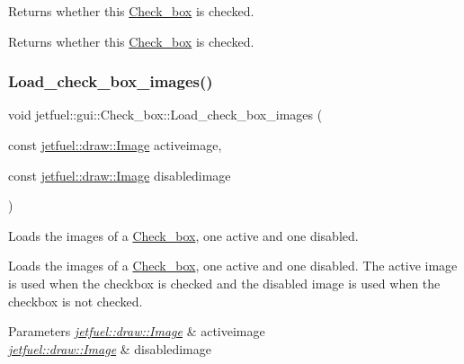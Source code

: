 Returns whether this \hyperlink{classjetfuel_1_1gui_1_1Check__box}{Check\+\_\+box} is checked. 

Returns whether this \hyperlink{classjetfuel_1_1gui_1_1Check__box}{Check\+\_\+box} is checked. \mbox{\label{classjetfuel_1_1gui_1_1Check__box_adadc280e5d14f08e64f974ba9156cd16}} 
\subsubsection{\texorpdfstring{Load\+\_\+check\+\_\+box\+\_\+images()}{Load\_check\_box\_images()}}
{\footnotesize\ttfamily void jetfuel\+::gui\+::\+Check\+\_\+box\+::\+Load\+\_\+check\+\_\+box\+\_\+images (\begin{DoxyParamCaption}\item[{const \hyperlink{classjetfuel_1_1draw_1_1Image}{jetfuel\+::draw\+::\+Image}}]{activeimage,  }\item[{const \hyperlink{classjetfuel_1_1draw_1_1Image}{jetfuel\+::draw\+::\+Image}}]{disabledimage }\end{DoxyParamCaption})\hspace{0.3cm}{\ttfamily [inline]}}



Loads the images of a \hyperlink{classjetfuel_1_1gui_1_1Check__box}{Check\+\_\+box}, one active and one disabled. 

Loads the images of a \hyperlink{classjetfuel_1_1gui_1_1Check__box}{Check\+\_\+box}, one active and one disabled. The active image is used when the checkbox is checked and the disabled image is used when the checkbox is not checked.


\begin{DoxyParams}{Parameters}
{\em \hyperlink{classjetfuel_1_1draw_1_1Image}{jetfuel\+::draw\+::\+Image}} & activeimage \\
\hline
{\em \hyperlink{classjetfuel_1_1draw_1_1Image}{jetfuel\+::draw\+::\+Image}} & disabledimage \\
\hline
\end{DoxyParams}
\mbox{\label{classjetfuel_1_1gui_1_1Check__box_a276fb1567260c41b07079c600143ce3d}} 
